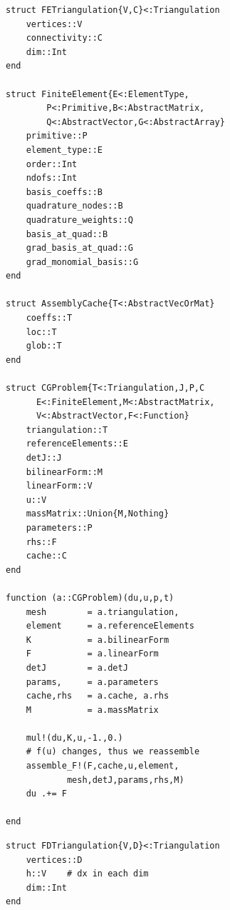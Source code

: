 \documentclass[sn-mathphys,Numbered]{sn-jnl}%
\theoremstyle{thmstyleone}%
\theoremstyle{thmstyletwo}%
\theoremstyle{thmstylethree}%
\begin{document}
\begin{figure}[!htbp]
\begin{minipage}[t]{0.5\textwidth}
\centering
\begin{verbatim}
struct FETriangulation{V,C}<:Triangulation
    vertices::V
    connectivity::C
    dim::Int
end

struct FiniteElement{E<:ElementType,
        P<:Primitive,B<:AbstractMatrix,
        Q<:AbstractVector,G<:AbstractArray}
    primitive::P
    element_type::E
    order::Int
    ndofs::Int
    basis_coeffs::B
    quadrature_nodes::B
    quadrature_weights::Q
    basis_at_quad::B
    grad_basis_at_quad::G
    grad_monomial_basis::G
end

struct AssemblyCache{T<:AbstractVecOrMat}
    coeffs::T
    loc::T
    glob::T
end

struct CGProblem{T<:Triangulation,J,P,C
      E<:FiniteElement,M<:AbstractMatrix,
      V<:AbstractVector,F<:Function}
    triangulation::T
    referenceElements::E
    detJ::J
    bilinearForm::M
    linearForm::V
    u::V
    massMatrix::Union{M,Nothing}
    parameters::P
    rhs::F
    cache::C
end

function (a::CGProblem)(du,u,p,t)
    mesh        = a.triangulation,
    element     = a.referenceElements
    K           = a.bilinearForm
    F           = a.linearForm
    detJ        = a.detJ
    params,     = a.parameters
    cache,rhs   = a.cache, a.rhs
    M           = a.massMatrix

    mul!(du,K,u,-1.,0.)
    # f(u) changes, thus we reassemble
    assemble_F!(F,cache,u,element,
            mesh,detJ,params,rhs,M)
    du .+= F

end
\end{verbatim}
\end{minipage}
\begin{minipage}[t]{0.5\textwidth}
\centering
\begin{verbatim}
struct FDTriangulation{V,D}<:Triangulation
    vertices::D
    h::V    # dx in each dim
    dim::Int
end























\end{verbatim}
\end{minipage}
\end{figure}
\end{document}
